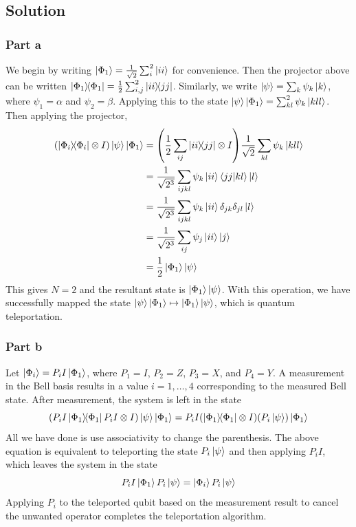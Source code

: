 \documentclass{article}
\begin{document}
{\subsection*{Solution}
\subsubsection*{Part a}
We begin by writing $\ket{\Phi_1} = \frac{1}{\sqrt{2}}\sum_{i}^2\ket{ii}$ for convenience. Then the projector above can be written $\ketbra{\Phi_1}{\Phi_1} = \frac{1}{2}\sum_{i,j}^2 \ketbra{ii}{jj}$. Similarly, we write $\ket{\psi} = \sum_{k}\psi_k \ket{k}$, where $\psi_1 = \alpha$ and $\psi_2 = \beta$. Applying this to the state $\ket{\psi}\ket{\Phi_1} = \sum_{kl}^2\psi_k\ket{kll}$. Then applying the projector, 
\begin{align*}
    (\ketbra{\Phi_i}{\Phi_i}\otimes I)\ket{\psi}\ket{\Phi_1} &= \qty(\frac{1}{2}\sum_{ij}\ketbra{ii}{jj}\otimes I)\frac{1}{\sqrt{2}}\sum_{kl}\psi_k\ket{kll} \\
    &= \frac{1}{\sqrt{2^3}}\sum_{ijkl}\psi_k \ket{ii} \braket{jj}{kl}\ket{l} \\
    &= \frac{1}{\sqrt{2^3}}\sum_{ijkl}\psi_k \ket{ii}\delta_{jk}\delta_{jl}\ket{l} \\
    &= \frac{1}{\sqrt{2^3}}\sum_{ij}\psi_j \ket{ii}\ket{j} \\
    &= \frac{1}{2}\ket{\Phi_1}\ket{\psi}
\end{align*}
This gives $N = 2$ and the resultant state is $\ket{\Phi_1}\ket{\psi}$. With this operation, we have successfully mapped the state $\ket{\psi}\ket{\Phi_1} \mapsto \ket{\Phi_1}\ket{\psi}$, which is quantum teleportation.

\subsubsection*{Part b}
Let $\ket{\Phi_i} = P_iI\ket{\Phi_1}$, where $P_1 = I$, $P_2 = Z$, $P_3 = X$, and $P_4 = Y$. A measurement in the Bell basis results in a value $i=1,\dots, 4$ corresponding to the measured Bell state. After measurement, the system is left in the state
\begin{equation}
    \qty(P_iI\ketbra{\Phi_1}{\Phi_1}P_iI \otimes I)\ket{\psi}\ket{\Phi_1} = P_iI\qty(\ketbra{\Phi_1}{\Phi_1} \otimes I)(P_i\ket{\psi})\ket{\Phi_1}
\end{equation}
All we have done is use associativity to change the parenthesis. The above equation is equivalent to teleporting the state $P_i\ket{\psi}$ and then applying $P_iI$, which leaves the system in the state
\begin{equation}
P_iI\ket{\Phi_1}P_i\ket{\psi} = \ket{\Phi_i}P_i\ket{\psi}
\end{equation}
Applying $P_i$ to the teleported qubit based on the measurement result to cancel the unwanted operator completes the teleportation algorithm.
}
\end{document}
